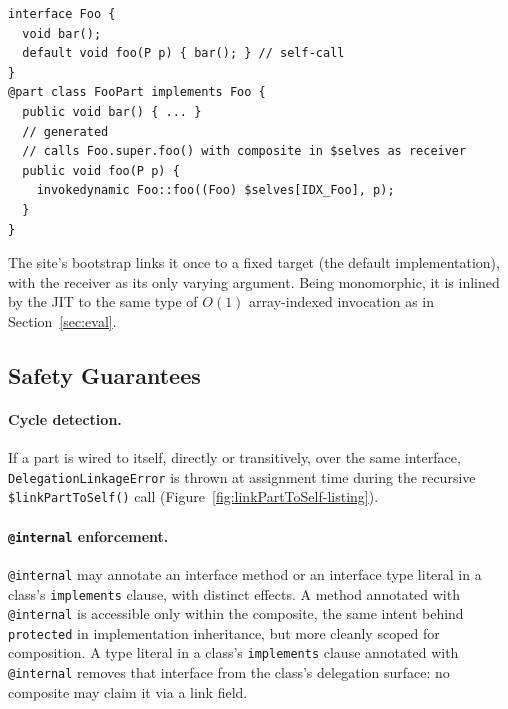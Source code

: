 \documentclass[acmsmall,screen,review,anonymous]{acmart}
\theoremstyle{acmplain}
\newcommand{\code}[1]{\texttt{#1}}
\begin{document}
\begin{lstlisting}
interface Foo {
  void bar();
  default void foo(P p) { bar(); } // self-call
}
@part class FooPart implements Foo {
  public void bar() { ... }
  // generated
  // calls Foo.super.foo() with composite in $selves as receiver
  public void foo(P p) {
    invokedynamic Foo::foo((Foo) $selves[IDX_Foo], p);
  }
}
\end{lstlisting}

The site's bootstrap links it once to a fixed target (the default implementation), with the receiver as its only varying
argument. Being monomorphic, it is inlined by the JIT to the same type of $O(1)$ array-indexed invocation as in Section~\ref{sec:eval}.

\subsection{Safety Guarantees}
\label{subsec:safety}

\paragraph{Cycle detection.}
If a part is wired to itself, directly or transitively, over the same interface, \code{De\-le\-ga\-tion\-Link\-age\-Er\-ror}
is thrown at assignment time during the recursive \code{\$linkPartToSelf()} call (Figure~\ref{fig:linkPartToSelf-listing}).

\paragraph{\code{@internal} enforcement.}
\code{@internal} may annotate an interface method or an interface type literal in a class's \code{implements} clause, with
distinct effects. A method annotated with \code{@internal} is accessible only within the composite, the same intent behind
\code{protected} in implementation inheritance, but more cleanly scoped for composition. A type literal in a class's \code{implements}
clause annotated with \code{@internal} removes that interface from the class's delegation surface: no composite may claim
it via a link field.
\end{document}
